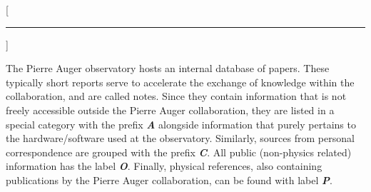 
[\hrule\vspace{-0.5cm}]
\printbibheading

The Pierre Auger observatory hosts an internal database of papers. These 
typically short reports serve to accelerate the exchange of knowledge within the
collaboration, and are called \GAP notes. Since they contain information that is
not freely accessible outside the Pierre Auger collaboration, they are listed in
a special category with the prefix \textbf{\textit{A}} alongside information 
that purely pertains to the hardware/software used at the observatory. 
Similarly, sources from personal correspondence are grouped with the prefix 
\textbf{\textit{C}}. All public (non-physics related) information has the label 
\textbf{\textit{O}}. Finally, physical references, also containing publications 
by the Pierre Auger collaboration, can be found with label \textbf{\textit{P}}.

\newrefcontext[labelprefix=A]
\printbibliography[keyword={auger},title={Auger internal},heading=subbibliography]

\newrefcontext[labelprefix=C]
\printbibliography[keyword={private},title={Personal Correspondence},heading=subbibliography]

\newrefcontext[labelprefix=O]
\printbibliography[notkeyword={private},notkeyword={phys},notkeyword={auger},title={Other References},heading=subbibliography]

\newrefcontext[labelprefix=P]
\printbibliography[keyword={phys},notkeyword={auger},title={Physics References},heading=subbibliography]

\cleardoublepage
